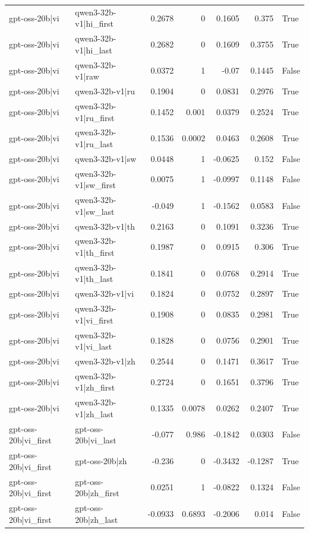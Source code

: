 \begin{table}
\begin{tabular}{l l r r r r l}
gpt-oss-20b|vi & qwen3-32b-v1|hi_first & 0.2678 & 0 & 0.1605 & 0.375 & True \\
gpt-oss-20b|vi & qwen3-32b-v1|hi_last & 0.2682 & 0 & 0.1609 & 0.3755 & True \\
gpt-oss-20b|vi & qwen3-32b-v1|raw & 0.0372 & 1 & -0.07 & 0.1445 & False \\
gpt-oss-20b|vi & qwen3-32b-v1|ru & 0.1904 & 0 & 0.0831 & 0.2976 & True \\
gpt-oss-20b|vi & qwen3-32b-v1|ru_first & 0.1452 & 0.001 & 0.0379 & 0.2524 & True \\
gpt-oss-20b|vi & qwen3-32b-v1|ru_last & 0.1536 & 0.0002 & 0.0463 & 0.2608 & True \\
gpt-oss-20b|vi & qwen3-32b-v1|sw & 0.0448 & 1 & -0.0625 & 0.152 & False \\
gpt-oss-20b|vi & qwen3-32b-v1|sw_first & 0.0075 & 1 & -0.0997 & 0.1148 & False \\
gpt-oss-20b|vi & qwen3-32b-v1|sw_last & -0.049 & 1 & -0.1562 & 0.0583 & False \\
gpt-oss-20b|vi & qwen3-32b-v1|th & 0.2163 & 0 & 0.1091 & 0.3236 & True \\
gpt-oss-20b|vi & qwen3-32b-v1|th_first & 0.1987 & 0 & 0.0915 & 0.306 & True \\
gpt-oss-20b|vi & qwen3-32b-v1|th_last & 0.1841 & 0 & 0.0768 & 0.2914 & True \\
gpt-oss-20b|vi & qwen3-32b-v1|vi & 0.1824 & 0 & 0.0752 & 0.2897 & True \\
gpt-oss-20b|vi & qwen3-32b-v1|vi_first & 0.1908 & 0 & 0.0835 & 0.2981 & True \\
gpt-oss-20b|vi & qwen3-32b-v1|vi_last & 0.1828 & 0 & 0.0756 & 0.2901 & True \\
gpt-oss-20b|vi & qwen3-32b-v1|zh & 0.2544 & 0 & 0.1471 & 0.3617 & True \\
gpt-oss-20b|vi & qwen3-32b-v1|zh_first & 0.2724 & 0 & 0.1651 & 0.3796 & True \\
gpt-oss-20b|vi & qwen3-32b-v1|zh_last & 0.1335 & 0.0078 & 0.0262 & 0.2407 & True \\
gpt-oss-20b|vi_first & gpt-oss-20b|vi_last & -0.077 & 0.986 & -0.1842 & 0.0303 & False \\
gpt-oss-20b|vi_first & gpt-oss-20b|zh & -0.236 & 0 & -0.3432 & -0.1287 & True \\
gpt-oss-20b|vi_first & gpt-oss-20b|zh_first & 0.0251 & 1 & -0.0822 & 0.1324 & False \\
gpt-oss-20b|vi_first & gpt-oss-20b|zh_last & -0.0933 & 0.6893 & -0.2006 & 0.014 & False \\

\end{tabular}
\end{table}
